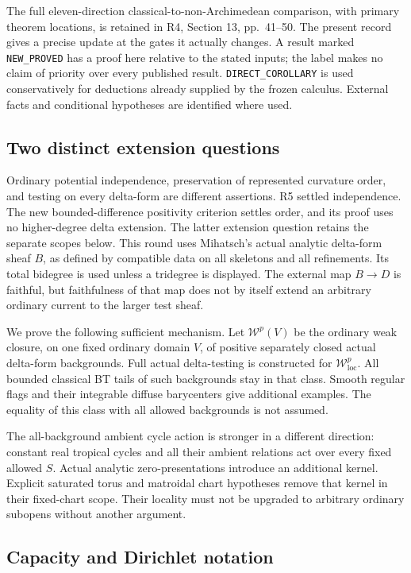\documentclass[11pt,a4paper]{article}
\numberwithin{equation}{section}
\theoremstyle{definition}
\theoremstyle{remark}
\begin{document}
The full eleven-direction classical-to-non-Archimedean comparison,
with primary theorem locations, is retained in R4, Section 13,
pp.~41--50. The present record gives a precise update at the gates
it actually changes. A result marked \texttt{NEW\_PROVED} has a proof
here relative to the stated inputs; the label makes no claim of
priority over every published result. \texttt{DIRECT\_COROLLARY}
is used conservatively for deductions already supplied by the frozen
calculus. External facts and conditional hypotheses are identified
where used.

\subsection{Two distinct extension questions}

Ordinary potential independence, preservation of represented curvature
order, and testing on every delta-form are different assertions. R5
settled independence. The new bounded-difference positivity criterion
settles order, and its proof uses no higher-degree delta extension.
The latter extension question retains the separate scopes below. This round uses Mihatsch's actual analytic
delta-form sheaf $B$, as defined by compatible data on all skeletons
and all refinements. Its total bidegree is used unless a tridegree is
displayed. The external map $B\to D$ is faithful, but faithfulness
of that map does not by itself extend an arbitrary ordinary current
to the larger test sheaf.

We prove the following sufficient mechanism. Let
$\mathcal W^p(V)$ be the ordinary weak closure, on one fixed ordinary
domain $V$, of positive separately closed actual delta-form
backgrounds. Full actual delta-testing is constructed for
$\mathcal W^p_{\mathrm{loc}}$. All bounded classical BT tails of
such backgrounds stay in that class. Smooth regular flags and their
integrable diffuse barycenters give additional examples. The
equality of this class with all allowed backgrounds is not assumed.

The all-background ambient cycle action is stronger in a different
direction: constant real tropical cycles and all their ambient
relations act over every fixed allowed $S$. Actual analytic
zero-presentations introduce an additional kernel. Explicit saturated
torus and matroidal chart hypotheses remove that kernel in their
fixed-chart scope. Their locality must not be upgraded to arbitrary
ordinary subopens without another argument.

\subsection{Capacity and Dirichlet notation}
\end{document}
